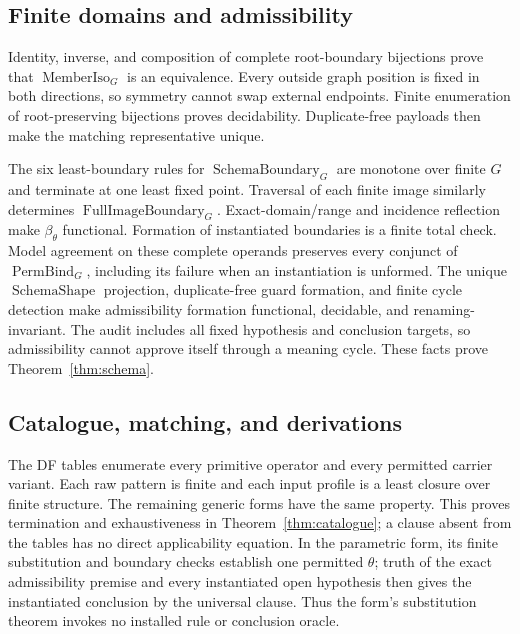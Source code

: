 \documentclass[11pt,twoside]{article}
\begin{document}
\subsection{Finite domains and admissibility}

Identity, inverse, and composition of complete root-boundary bijections prove that
\(\operatorname{MemberIso}_G\) is an equivalence.  Every outside graph position is
fixed in both directions, so symmetry cannot swap external endpoints.  Finite
enumeration of root-preserving bijections proves decidability.  Duplicate-free
payloads then make the matching representative unique.

The six least-boundary rules for \(\operatorname{SchemaBoundary}_G\) are monotone
over finite \(G\) and terminate at one least fixed point.  Traversal of each finite
image similarly determines \(\operatorname{FullImageBoundary}_G\).
Exact-domain/range and incidence reflection make \(\beta_\theta\) functional.
Formation of instantiated boundaries is a finite total check.  Model agreement on
these complete operands preserves every conjunct of
\(\operatorname{PermBind}_G\), including its failure when an instantiation is
unformed.  The unique \(\operatorname{SchemaShape}\) projection,
duplicate-free guard formation, and finite
cycle detection make admissibility formation functional, decidable, and
renaming-invariant.  The audit includes all fixed hypothesis and conclusion
targets, so admissibility cannot approve itself through a meaning cycle.  These
facts prove Theorem~\ref{thm:schema}.

\subsection{Catalogue, matching, and derivations}

The DF tables enumerate every primitive operator and every
permitted carrier variant.  Each raw pattern is finite and each input profile is a
least closure over finite structure.  The remaining generic forms have the same
property.  This proves termination and exhaustiveness in
Theorem~\ref{thm:catalogue}; a clause absent from the tables has no direct
applicability equation.  In the parametric form, its finite substitution and
boundary checks establish one permitted \(\theta\); truth of the exact
admissibility premise and every instantiated open hypothesis then gives the
instantiated conclusion by the universal clause.  Thus the form's substitution
theorem invokes no installed rule or conclusion oracle.
\end{document}
